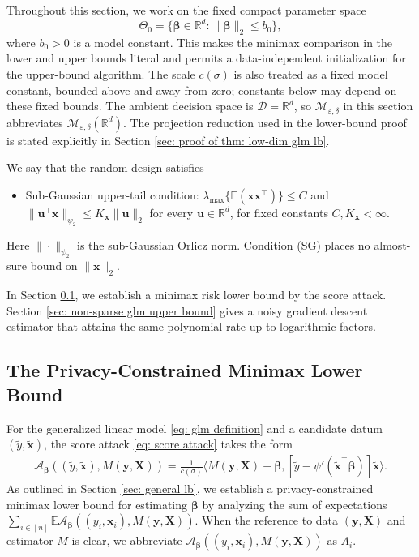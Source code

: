 \documentclass[letterpaper,12pt]{article}
\numberwithin{equation}{section}
\theoremstyle{plain}
\numberwithin{Theorem}{section}
\numberwithin{proposition}{section}
\numberwithin{Lemma}{section}
{
	\theoremstyle{definition}
	\newtheorem{Definition}{Definition}
	\newtheorem{example}{Example}
	\numberwithin{example}{section}
	\newtheorem{fact}{Fact}
	\numberwithin{fact}{section}
	\newtheorem{remark}{Remark}
}
\newcommand{\furtherrev}[1]{#1}
\newcommand{\A}{\mathcal{A}}
\newcommand{\1}{\mathbbm{1}}
\def\bbeta{{\boldsymbol{\beta}}}
\def\E{\mathbb{E}}
\begin{document}
{Throughout this section, we work on the fixed compact parameter space
\[
\Theta_0=\{\bbeta\in\mathbb R^d:\|\bbeta\|_2\leq b_0\},
\]
where $b_0>0$ is a model constant.  This makes the minimax comparison in the lower and upper bounds literal and permits a data-independent initialization for the upper-bound algorithm.}
{The scale $c(\sigma)$ is also treated as a fixed model constant, bounded above and away from zero; constants below may depend on these fixed bounds.}
\furtherrev{The ambient decision space is $\mathcal D=\mathbb R^d$, so $\mathcal M_{\varepsilon,\delta}$ in this section abbreviates $\mathcal M_{\varepsilon,\delta}(\mathbb R^d)$. The projection reduction used in the lower-bound proof is stated explicitly in Section \ref{sec: proof of thm: low-dim glm lb}.}

We say that the random design satisfies
\begin{itemize}
	\item [(SG)] Sub-Gaussian upper-tail condition:
	$\lambda_{\max}\{\E(\bm x\bm x^\top)\}\leq C$ and
	$\|\bm u^\top\bm x\|_{\psi_2}\leq K_{\bm x}\|\bm u\|_2$
	for every $\bm u\in\mathbb R^d$, for fixed constants
	$C,K_{\bm x}<\infty$.
\end{itemize}
Here $\|\cdot\|_{\psi_2}$ is the sub-Gaussian Orlicz norm. Condition (SG)
places no almost-sure bound on $\|\bm x\|_2$.

In Section \ref{sec: non-sparse glm lower bound}, we establish a minimax risk lower bound by the score attack. Section \ref{sec: non-sparse glm upper bound} gives a noisy gradient descent estimator that attains the same polynomial rate up to logarithmic factors.

\subsection{The Privacy-Constrained Minimax Lower Bound} \label{sec: non-sparse glm lower bound}
For the generalized linear model \eqref{eq: glm definition} and a candidate datum $(\tilde y, \tilde{\bm x})$, the score attack \eqref{eq: score attack} takes the form
\begin{align}\label{eq: low-dim glm attack}
	\A_{\bbeta} ((\tilde y, \tilde{\bm x}), M(\bm y, \bm X)) = \frac{1}{c(\sigma)} \big\langle M(\bm y, \bm X) - \bbeta, [\tilde y - \psi'(\tilde{\bm x}^\top\bbeta)] \tilde {\bm x} \big\rangle.
\end{align}
As outlined in Section \ref{sec: general lb}, we establish a privacy-constrained minimax lower bound for estimating $\bbeta$ by analyzing the sum of expectations $\sum_{i \in [n]} \E \A_\bbeta ((y_i, \bm x_i), M(\bm y, \bm X))$. When the reference to data $(\bm y, \bm X)$ and estimator $M$ is clear, we abbreviate $\A_\bbeta ((y_i, \bm x_i), M(\bm y, \bm X))$ as $A_i$.
\end{document}
